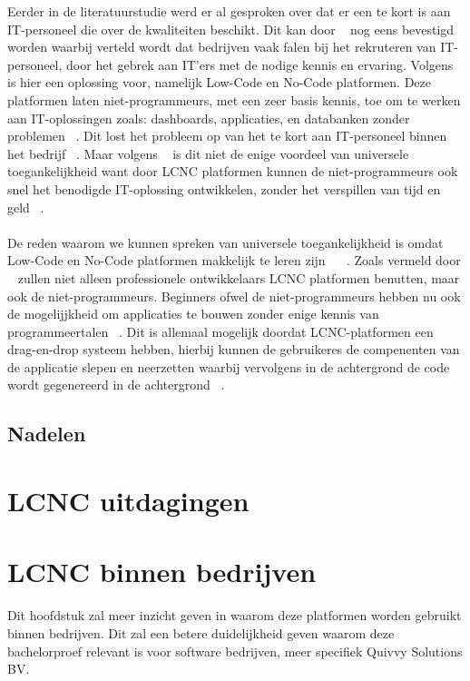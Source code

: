 Eerder in de literatuurstudie werd er al gesproken over dat er een te kort is aan IT-personeel die over de kwaliteiten beschikt. 
Dit kan door ~\textcite{Sufi_2023} nog eens bevestigd worden waarbij 
verteld wordt dat bedrijven vaak falen bij het rekruteren van IT-personeel, door het gebrek aan IT'ers met de nodige kennis en ervaring.
Volgens ~\textcite{Sufi_2023} is hier een oplossing voor, namelijk Low-Code en No-Code platformen. Deze platformen laten niet-programmeurs, met een zeer basis kennis,
toe om te werken aan IT-oplossingen zoals: dashboards, applicaties, en databanken zonder problemen ~\autocite{Sufi_2023}. Dit lost het probleem op van het te kort aan IT-personeel binnen het bedrijf ~\autocite{Sufi_2023}.
Maar volgens ~\textcite{Sufi_2023} is dit niet de enige voordeel van universele toegankelijkheid want door LCNC platformen kunnen de niet-programmeurs ook
snel het benodigde IT-oplossing ontwikkelen, zonder het verspillen van tijd en geld ~\autocite{Sufi_2023}.
\\
\\
De reden waarom we kunnen spreken van universele toegankelijkheid is omdat Low-Code en No-Code platformen makkelijk te leren zijn ~\autocite{Sufi_2023} ~\autocite{ALSAADI_2021}.
Zoals vermeld door ~\textcite{ALSAADI_2021} zullen niet alleen professionele ontwikkelaars LCNC platformen benutten, maar ook de niet-programmeurs.
Beginners ofwel de niet-programmeurs hebben nu ook de mogelijjkheid om applicaties te bouwen zonder enige kennis van programmeertalen ~\autocite{ALSAADI_2021}.
Dit is allemaal mogelijk doordat LCNC-platformen een drag-en-drop systeem hebben, hierbij kunnen de gebruikeres de compenenten van de applicatie slepen en neerzetten waarbij vervolgens in de achtergrond de code wordt 
gegenereerd in de achtergrond ~\autocite{ALSAADI_2021}.


\subsection{Nadelen}%
\label{subsec:nadelen}

\section{LCNC uitdagingen}%
\label{sec:lcnc-uitdagingen}

\section{LCNC binnen bedrijven}
\label{sec:lcnc-bedrijven}
Dit hoofdstuk zal meer inzicht geven in waarom deze platformen worden gebruikt binnen bedrijven. Dit zal een betere duidelijkheid geven
waarom deze bachelorproef relevant is voor software bedrijven, meer specifiek Quivvy Solutions BV.

